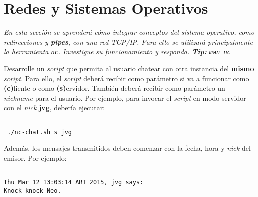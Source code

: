 \section{Redes y Sistemas Operativos}

\textit{En esta sección se aprenderá cómo integrar conceptos del sistema
  operativo, como redirecciones y \textbf{pipes}, con una red TCP/IP. Para
  ello se utilizará principalmente la herramienta
  \texttt{nc}. Investigue su funcionamiento y responda. \textbf{Tip:} \texttt{man nc}}

\begin{questions}
  \question Desarrolle un \textit{script} que permita al usuario chatear
  con otra instancia del \textbf{mismo} \textit{script}. Para ello, el
  \textit{script} deberá recibir como parámetro si va a funcionar como
  \textbf{(c)}liente o como \textbf{(s)}ervidor. También deberá recibir
  como parámetro un \textit{nickname} para el usuario. Por ejemplo, para
  invocar el \textit{script} en modo servidor con el \textit{nick}
  \textbf{jvg}, debería ejecutar:

  \begin{lstlisting}

 ./nc-chat.sh s jvg
\end{lstlisting}

Además, los mensajes transmitidos deben comenzar con la fecha, hora y
\textit{nick} del emisor. Por ejemplo:
\begin{lstlisting}
  
Thu Mar 12 13:03:14 ART 2015, jvg says:
Knock knock Neo.
\end{lstlisting}  

\end{questions}
